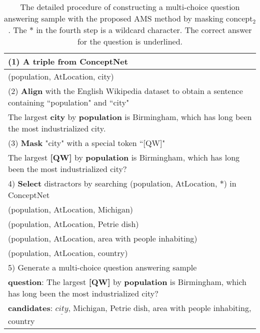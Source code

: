 \documentclass[11pt,a4paper]{article}
\begin{document}
\begin{table}[t]
	\small
	\begin{center}
		\begin{tabular}{p{7.0cm}}
			\toprule
			(1) A triple from ConceptNet \\
			\midrule
			(population, AtLocation, city) \\
			\midrule
			(2) \textbf{Align} with the English Wikipedia dataset to obtain a sentence containing ``population" and ``city" \\
			\midrule
			The largest \textbf{city} by \textbf{population} is Birmingham, which has long been the most industrialized city. \\
			\midrule
			(3) \textbf{Mask} "city" with a special token ``[QW]" \\
			\midrule
			The largest \textbf{[QW]} by \textbf{population} is Birmingham, which has long been the most industrialized city? \\
			\midrule
			4) \textbf{Select} distractors by searching (population, AtLocation, $\ast$) in ConceptNet \\
			\midrule
			(population, AtLocation, Michigan) \\
			(population, AtLocation, Petrie dish) \\
			(population, AtLocation, area with people inhabiting) \\
			(population, AtLocation, country) \\
			\midrule
			5) Generate a multi-choice question answering sample \\
			\midrule
			\textbf{question}: The largest \textbf{[QW]} by \textbf{population} is Birmingham, which has long been the most industrialized city? \\
			\textbf{candidates}: $\underline{city}$, Michigan, Petrie dish, area with people inhabiting, country \\
			\bottomrule
		\end{tabular}
	\end{center}
	\caption{
		The detailed procedure of constructing a multi-choice question answering sample with the proposed AMS method by masking concept$_2$.
		The $\ast$ in the fourth step is a wildcard character.
		The correct answer for the question is underlined.}
	\label{data_construction}
\end{table}
\end{document}
